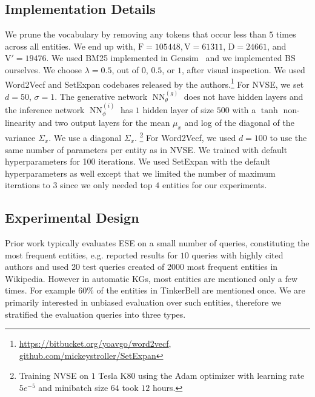 \documentclass[a4paper]{article}
\newcommand{\rDoc}{\mathrm{D}}
\newcommand{\rVp}{\mathrm{V'}}
\newcommand{\rF}{\mathrm{F}}
\newcommand{\rV}{\mathrm{V}}
\DeclareMathOperator{\NN}{NN}
\newcommand{\gennn}{\NN^{(g)}_\theta}
\newcommand{\infnn}{\NN^{(i)}_\phi}
\newcommand{\wTv}{Word2Vecf\xspace}
\newcommand{\setX}{SetExpan\xspace}
\newcommand{\nvge}{NVSE\xspace}
\newcommand{\mycite}[1]{\cite{#1}}%
\newcommand{\myciteauthor}[1]{\cite{#1}}%
\begin{document}
\subsection{Implementation Details}
We prune the vocabulary by removing any tokens that occur less than $5$ times across all entities.
We end up with, $\rF {=} 105448, \rV = 61311$, $\rDoc =  24661$, and  $\rVp = 19476$.
We used BM25 implemented in Gensim~\mycite{rehurek_lrec} and we
implemented BS ourselves. %
We choose $\lambda=0.5$, out of $0$, $0.5$, or $1$, after visual inspection. We used 
\wTv and \setX codebases released by the authors.\footnote{\url{https://bitbucket.org/yoavgo/word2vecf}, \url{github.com/mickeystroller/SetExpan}}
For \nvge, we set $d{=}50$, $\sigma{=}1$. The generative network $\gennn$ does not have hidden layers and the inference network $\infnn$ has $1$ hidden layer of size $500$ with a $\tanh$ non-linearity and two output layers for the mean $\mu_x$
and log of the diagonal of the variance $\Sigma_x$. We use a diagonal $\Sigma_x$.
\footnote{Training \nvge on $1$ Tesla K80 using the Adam optimizer %
  with learning rate $5e^{{-}5}$
  and minibatch size $64$ took $12$ hours.}
For \wTv, we used $d=100$ to use the same number of parameters per entity as in \nvge. We trained with default hyperparameters for 100 iterations. We used \setX with the default hyperparameters as well except that we limited the number of maximum iterations to $3$ since we only needed top $4$ entities for our experiments.


\subsection{Experimental Design}
Prior work typically evaluates ESE on a small number of queries, constituting the most frequent entities, e.g. \myciteauthor{ghahramani2006bayesian} reported results for $10$ queries with highly cited authors and \myciteauthor{shen2017setexpan} used 20 test queries created of 2000 most frequent entities in Wikipedia. However in automatic KGs, most entities are mentioned only a few times. For example 60\% of the entities in TinkerBell are mentioned once. We are primarily interested in unbiased evaluation over such entities, therefore we stratified the evaluation queries into three types.
\end{document}
